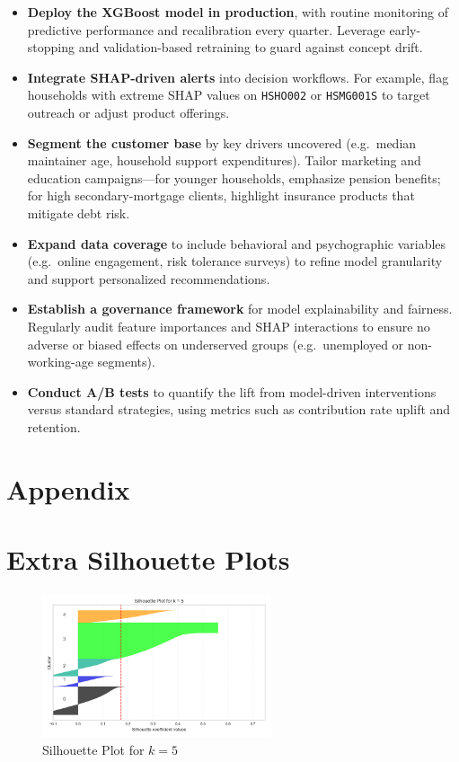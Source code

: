 \documentclass{article}
\begin{document}
\begin{itemize}
  \item \textbf{Deploy the XGBoost model in production}, with routine monitoring of predictive performance and recalibration every quarter. Leverage early-stopping and validation-based retraining to guard against concept drift.
  \item \textbf{Integrate SHAP-driven alerts} into decision workflows. For example, flag households with extreme SHAP values on \texttt{HSHO002} or \texttt{HSMG001S} to target outreach or adjust product offerings.
  \item \textbf{Segment the customer base} by key drivers uncovered (e.g.\ median maintainer age, household support expenditures). Tailor marketing and education campaigns—for younger households, emphasize pension benefits; for high secondary-mortgage clients, highlight insurance products that mitigate debt risk.
  \item \textbf{Expand data coverage} to include behavioral and psychographic variables (e.g.\ online engagement, risk tolerance surveys) to refine model granularity and support personalized recommendations.
  \item \textbf{Establish a governance framework} for model explainability and fairness. Regularly audit feature importances and SHAP interactions to ensure no adverse or biased effects on underserved groups (e.g.\ unemployed or non-working-age segments).
  \item \textbf{Conduct A/B tests} to quantify the lift from model-driven interventions versus standard strategies, using metrics such as contribution rate uplift and retention.
\end{itemize}

\appendix
\section*{Appendix}
\section{Extra Silhouette Plots}

\begin{figure}[H]
    \centering
    \includegraphics[width=0.6\textwidth]{figures/silhouette_k5.png}
    \caption{Silhouette Plot for $k=5$}
    \label{fig:silhouette_k5}
\end{figure}
\end{document}
